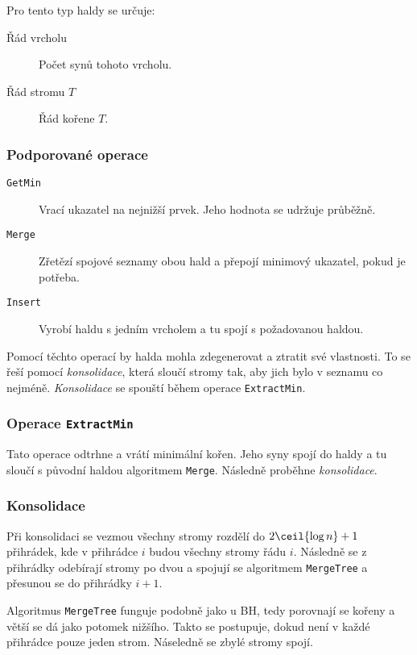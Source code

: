 Pro tento typ haldy se určuje:

\begin{description}
    \item[Řád vrcholu] Počet synů tohoto vrcholu.
    \item[Řád stromu $T$] Řád kořene $T$.
\end{description}

\subsubsection{Podporované operace}

\begin{description}
    \item[\texttt{GetMin}] Vrací ukazatel na nejnižší prvek.
    Jeho hodnota se udržuje průběžně.
    \item[\texttt{Merge}] Zřetězí spojové seznamy obou hald a přepojí minimový ukazatel, pokud je potřeba.
    \item[\texttt{Insert}] Vyrobí haldu s jedním vrcholem a tu spojí s požadovanou haldou.
\end{description}

Pomocí těchto operací by halda mohla zdegenerovat a ztratit své vlastnosti.
To se řeší pomocí \textit{konsolidace}, která sloučí stromy tak, aby jich bylo v seznamu co nejméně.
\textit{Konsolidace} se spouští během operace \texttt{ExtractMin}.

\subsubsection{Operace \texttt{ExtractMin}}

Tato operace odtrhne a vrátí minimální kořen.
Jeho syny spojí do haldy a tu sloučí s původní haldou algoritmem \texttt{Merge}.
Následně proběhne \textit{konsolidace}.

\subsubsection{Konsolidace}

Při konsolidaci se vezmou všechny stromy rozdělí do $2\ceil{\log n} + 1$ přihrádek, kde v přihrádce $i$ budou všechny stromy řádu $i$.
Následně se z přihrádky odebírají stromy po dvou a spojují se algoritmem \texttt{MergeTree} a přesunou se do přihrádky $i+1$.

Algoritmus \texttt{MergeTree} funguje podobně jako u BH, tedy porovnají se kořeny a větší se dá jako potomek nižšího.
Takto se postupuje, dokud není v každé přihrádce pouze jeden strom.
Náseledně se zbylé stromy spojí.

